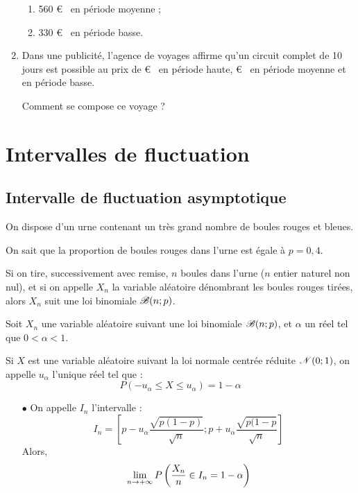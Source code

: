 \documentclass[12pt,french]{book}
\begin{document}
\begin{spacing}{1.2}
\begin{enumerate}
\begin{enumerate}
	\item 560 \euro~ en période moyenne ;
	
	\item 330 \euro~ en période basse.
	
	\end{enumerate}

\item Dans une publicité, l'agence de voyages affirme qu'un circuit complet de 10 jours est possible au prix de  \euro~ en période haute,  \euro~ en période moyenne et  en période basse.

Comment se compose ce voyage ?

\end{enumerate}



\newpage
\section{Intervalles de fluctuation}

\subsection{Intervalle de fluctuation asymptotique}

On dispose d'un urne contenant un très grand nombre de boules rouges et bleues.

On sait que la proportion de boules rouges dans l'urne est égale à $p=0,4$.

Si on tire, successivement avec remise, $n$ boules dans l'urne ($n$ entier naturel non nul), et si on appelle $X_n$ la variable aléatoire dénombrant les boules rouges tirées, alors $X_n$ suit une loi binomiale $\mathscr{B}(n;p)$.

\medskip

\begin{theo}
Soit $X_n$ une variable aléatoire suivant une loi binomiale $\mathscr{B}(n;p)$, et $\alpha$ un réel tel que $0<\alpha<1$.

Si $X$ est une variable aléatoire suivant la loi normale centrée réduite $\mathscr{N}(0;1)$, on appelle $u_{\alpha}$ l'unique réel tel que :
\[P(-u_{\alpha}\leq X\leq u_{\alpha})=1-\alpha\]
\begin{itemize}
\item[$\bullet$] On appelle $I_n$ l'intervalle :
\[I_n=\left[p-u_{\alpha}\frac{\sqrt{p(1-p)}}{\sqrt{n}};p+u_{\alpha}\frac{\sqrt{p(1-p}}{\sqrt{n}}\right]\]
Alors,
\[\limn P\left(\frac{X_n}{n}\in I_n=1-\alpha\right)\]


\end{itemize}
\end{theo}
\end{spacing}
\end{document}

